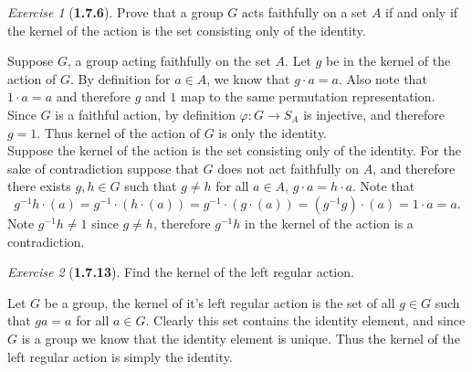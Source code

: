 \documentclass[12pt]{amsart}
\makeatletter
\theoremstyle{remark}
\newtheorem*{exercise}{Exercise}%
\renewenvironment{proof}[1][\proofname]{\par\doublespacing
  \pushQED{\qed}%
  \normalfont \topsep6\p@\@plus6\p@\relax
  \list{}{%
    \settowidth{\leftmargin}{\itshape\proofname:\hskip\labelsep}%
    \setlength{\labelwidth}{0pt}%
    \setlength{\itemindent}{-\leftmargin}%
  }%
  \item[\hskip\labelsep\itshape#1\@addpunct{:}]\ignorespaces
}{%
  \popQED\endlist\@endpefalse
  \singlespacing
}
\theoremstyle{mycomment}
\makeatother
\begin{document}
\begin{exercise}[\textbf{1.7.6}] Prove that a group $G$ acts faithfully on a set $A$ if and only if the kernel of the action is the 
  set consisting only of the identity.\\
  \begin{proof} Suppose $G$, a group acting faithfully on the set $A$. Let $g$ be in the kernel of the action of $G$. By definition for 
    $a \in A$, we know that $g \cdot a = a$. Also note that $1 \cdot a = a$ and therefore $g$ and $1$ map to the same permutation representation.
    Since $G$ is a faithful action, by definition $\varphi: G \to S_A$ is injective, and therefore $g = 1$. Thus kernel of the action of $G$ 
    is only the identity. \\

    Suppose the kernel of the action is the set consisting only of the identity. For the sake of contradiction suppose that $G$ does not act faithfully on $A$, and therefore
    there exists $g, h \in G$ such that $g \neq h$ for all $a \in A$,  $g \cdot a = h \cdot a$. Note that 
    \begin{equation*}
      g^{-1}h \cdot (a) = g^{-1}\cdot (h \cdot (a)) = g^{-1}\cdot (g \cdot (a))  = (g^{-1}g) \cdot (a) = 1 \cdot a = a.
    \end{equation*}
    Note $g^{-1}h \neq 1$ since $g \neq h$, therefore $g^{-1}h$ in the kernel of the action is a contradiction.
  \end{proof}
\end{exercise}
\vspace{.15in}




\begin{exercise}[\textbf{1.7.13}] Find the kernel of the left regular action.\\
  \begin{proof} Let $G$ be a group, the kernel of it's left regular action is the set of all $g \in G$ such that 
    $ga = a$ for all $a \in G$. Clearly this set contains the identity element, and since $G$ is a group we know that the identity element is unique. 
    Thus the kernel of the left regular action is simply the identity.
  \end{proof}
\end{exercise}
\vspace{.15in}
\end{document}
